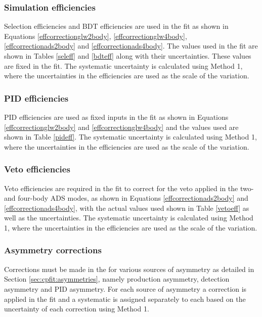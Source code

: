 \subsubsection{Simulation efficiencies}

Selection efficiencies and BDT efficiencies are used in the \CP fit as shown in Equations \ref{effcorrectionglw2body}, \ref{effcorrectionglw4body}, \ref{effcorrectionads2body} and \ref{effcorrectionads4body}. The values used in the \CP fit are shown in Tables \ref{seleff} and \ref{bdteff} along with their uncertainties. These values are fixed in the \CP fit. The systematic uncertainty is calculated using Method 1, where the uncertainties in the efficiencies are used as the scale of the variation.

\subsubsection{PID efficiencies}

PID efficiencies are used as fixed inputs in the \CP fit as shown in Equations \ref{effcorrectionglw2body} and \ref{effcorrectionglw4body} and the values used are shown in Table \ref{pideff}. The systematic uncertainty is calculated using Method 1, where the uncertainties in the efficiencies are used as the scale of the variation.

\subsubsection{Veto efficiencies}

Veto efficiencies are required in the \CP fit to correct for the veto applied in the two- and four-body ADS modes, as shown in Equations \ref{effcorrectionads2body} and \ref{effcorrectionads4body}, with the actual values used shown in Table \ref{vetoeff} as well as the uncertainties. The systematic uncertainty is calculated using Method 1, where the uncertainties in the efficiencies are used as the scale of the variation.

\subsubsection{Asymmetry corrections}

Corrections must be made in the \CP for various sources of asymmetry as detailed in Section \ref{sec:cpfit:asymmetries}, namely production asymmetry, detection asymmetry and PID asymmetry. For each source of asymmetry a correction is applied in the \CP fit and a systematic is assigned separately to each based on the uncertainty of each correction using Method 1. 

